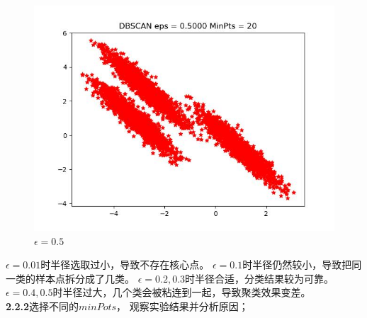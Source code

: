 \documentclass[UTF8]{ctexart}
\begin{document}
\begin{figure}[H]
\begin{minipage}{0.32\linewidth}
		\includegraphics[width=0.9\linewidth]{data3-0.5.jpg}
		\caption{$\epsilon=0.5$}
		\label{chutian2}%
	\end{minipage}
\end{figure}

$\epsilon=0.01$时半径选取过小，导致不存在核心点。
$\epsilon=0.1$时半径仍然较小，导致把同一类的样本点拆分成了几类。
$\epsilon=0.2,0.3$时半径合适，分类结果较为可靠。
$\epsilon=0.4,0.5$时半径过大，几个类会被粘连到一起，导致聚类效果变差。\\




\noindent \textbf{2.2.2}选择不同的$minPots$， 观察实验结果并分析原因； 
\end{document}
